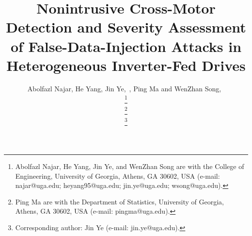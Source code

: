 \documentclass[lettersize,journal]{IEEEtran}
\begin{document}
\title{Nonintrusive Cross-Motor Detection and Severity Assessment of False-Data-Injection Attacks in Heterogeneous Inverter-Fed Drives
}

\author{%
    Abolfazl Najar, He Yang, Jin Ye,~,  Ping Ma and WenZhan Song,~%

    \thanks{Abolfazl Najar, He Yang, Jin Ye, and WenZhan Song are with the College of Engineering, University of Georgia, Athens, GA 30602, USA (e-mail: najar@uga.edu; heyang95@uga.edu; jin.ye@uga.edu; wsong@uga.edu).}%
    
    \thanks{Ping Ma are with the Department of Statistics, University of Georgia, Athens, GA 30602, USA (e-mail: pingma@uga.edu).}%
    
    \thanks{Corresponding author: Jin Ye (e-mail: jin.ye@uga.edu).}%
    
}

\maketitle
\end{document}
